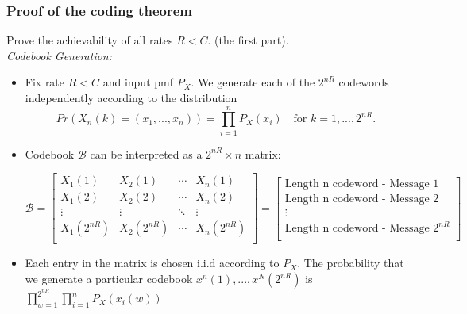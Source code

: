 \documentclass[12pt]{article}
\begin{document}
\subsubsection{Proof of the coding theorem}
Prove the achievability of all rates $R<C$. (the first part).\\
{\large \textcolor{blue1}{\textit{Codebook Generation:}}}
\begin{itemize}
    \item Fix rate $R<C$ and input pmf $P_X$. We generate each of the $2^{nR}$ codewords independently according to the distribution
    \[
    Pr(X_n(k) = (x_1,...,x_n)) = \prod_{i=1}^n P_X(x_i)\quad \textrm{for } k=1,...,2^{nR}.
    \]
    \item Codebook $\mathcal{B}$ can be interpreted as a $2^{nR} \times n$ matrix:
        
        \[
        \mathcal{B}
        =
        \begin{bmatrix}
        X_1(1) & X_2(1) & \cdots& X_n(1) \\
        X_1(2) & X_2(2) & \cdots& X_n(2) \\
        \vdots & \vdots & \ddots& \vdots \\
        X_1(2^{nR}) & X_2(2^{nR}) & \cdots& X_n(2^{nR}) \\
        \end{bmatrix}
        =
        \begin{bmatrix}
        \textrm{Length n codeword - Message }1 \\
        \textrm{Length n codeword - Message }2 \\
        \vdots \\
        \textrm{Length n codeword - Message }2^{nR} \\
        \end{bmatrix}
        \]
        

    \item Each entry in the matrix is chosen i.i.d according to $P_X$. The probability that we generate a particular codebook $x^n(1),...,x^N(2^{nR})$ is $\prod_{w=1}^{2^{nR}}\prod_{i=1}^n P_X(x_i(w))$
\end{itemize}
\end{document}
